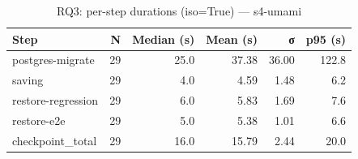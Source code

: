 \begin{table}[htbp]
\centering
\small
\caption{RQ3: per-step durations (iso=True) — s4-umami}
\label{tab:rq3-s4-umami-steps}
\begin{tabular}{lrrrrr}
\toprule
\textbf{Step} & \textbf{N} & \textbf{Median (s)} & \textbf{Mean (s)} & \textbf{σ} & \textbf{p95 (s)} \\
\midrule
postgres-migrate & 29 & 25.0 & 37.38 & 36.00 & 122.8 \\
saving & 29 & 4.0 & 4.59 & 1.48 & 6.2 \\
restore-regression & 29 & 6.0 & 5.83 & 1.69 & 7.6 \\
restore-e2e & 29 & 5.0 & 5.38 & 1.01 & 6.6 \\
checkpoint_total & 29 & 16.0 & 15.79 & 2.44 & 20.0 \\
\bottomrule
\end{tabular}
\end{table}